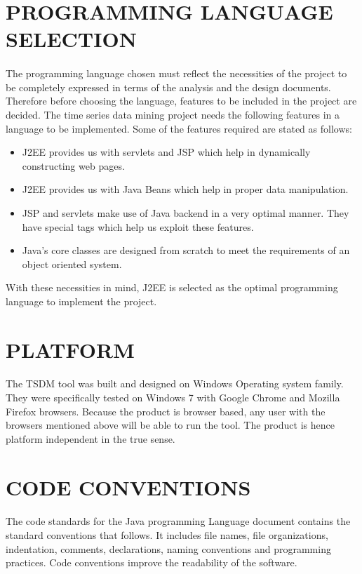 \documentclass[12pt]{report}
\begin{document}
\section{PROGRAMMING LANGUAGE SELECTION}

\paragraph{}The programming language chosen must reflect the necessities of the project to be completely expressed in terms of the analysis and the design documents. Therefore before choosing the language, features to be included in the project are decided. The time series data mining project needs the following features in a language to be implemented. Some of the features required are stated as follows:
\begin{itemize}
\item J2EE provides us with servlets and JSP which help in dynamically constructing web pages.
\item J2EE provides us with Java Beans which help in proper data manipulation.
\item JSP and servlets make use of Java backend in a very optimal manner. They have special tags which help us exploit these features.
\item Java's core classes are designed from scratch to meet the requirements of an object oriented system.
\end{itemize} 
With these necessities in mind, J2EE is selected as the optimal programming language to implement the project.
\section{PLATFORM}
\paragraph{}The TSDM tool was built and designed on Windows Operating system family. They were specifically tested on Windows 7 with Google Chrome and Mozilla Firefox browsers. Because the product is browser based, any user with the browsers mentioned above will be able to run the tool. The product is hence platform independent in the true sense.
\section{CODE CONVENTIONS}
\paragraph{}The code standards for the Java programming Language document contains the standard conventions that follows. It includes file names, file organizations, indentation, comments, declarations, naming conventions and programming practices. Code conventions improve the readability of the software.
\end{document}
